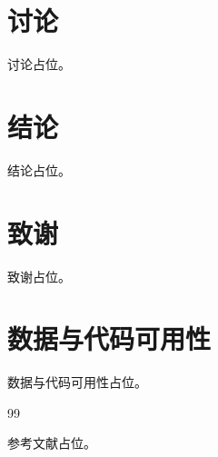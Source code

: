 \documentclass[UTF8,twocolumn]{ctexart}
\begin{document}
\section{讨论}

讨论占位。

\section{结论}

结论占位。

\section*{致谢}

致谢占位。

\section*{数据与代码可用性}

数据与代码可用性占位。

\balance

\begin{thebibliography}{99}

参考文献占位。

\end{thebibliography}
\end{document}

